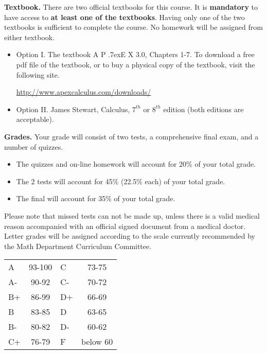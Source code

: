 \documentclass{article}
\newcommand{\apex}{A\kern -1pt \lower -2pt\hbox{P}\kern -4pt \lower .7ex\hbox{E}\kern -1pt X}
\begin{document}
\medskip\noindent \textbf{Textbook. } There are two official textbooks for this course. It is  \textbf{mandatory} to have access to \textbf{at least one of the textbooks}. Having only one of the two textbooks is sufficient to complete the course. No homework will be assigned from either textbook. 

\begin{itemize}
\item Option I. The textbook \apex{} 3.0, Chapters 1-7. To download a free pdf file of the textbook, or to buy a physical copy of the textbook, visit the following site.

\url{http://www.apexcalculus.com/downloads/} 
\item Option II. James Stewart, Calculus, $7^{th}$ or $8^{th}$ edition (both editions are acceptable).
\end{itemize}



\medskip
\noindent \textbf{Grades.} Your grade will consist of two tests, a comprehensive final exam, and a number of quizzes. 
\begin{itemize}
\item The quizzes and on-line homework will account for 20\% of your total grade.
\item The 2 tests will account for 45\% (22.5\% each) of your total grade.
\item The final will account for 35\% of your total grade.
\end{itemize}
Please note that missed tests can not be made up, unless there is a valid medical reason accompanied with an official signed document from a medical doctor. Letter grades will be assigned according to the scale currently recommended by the Math Department Curriculum Committee. 

\begin{center}
\begin{tabular}{lc|lc}
A & 93-100 & C  & 73-75 \\
A-& 90-92  & C- & 70-72 \\
B+& 86-99  & D+ & 66-69 \\
B & 83-85  & D  & 63-65\\
B-& 80-82  & D- & 60-62\\
C+& 76-79  & F  & below 60\\
\end{tabular}

\end{center}
\end{document}
